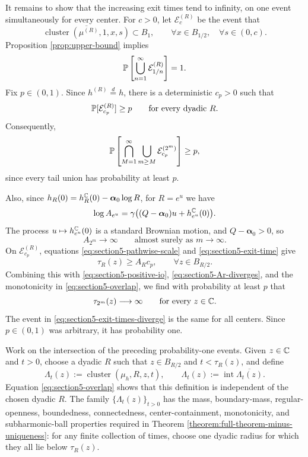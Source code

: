\documentclass[12pt]{amsart}
\numberwithin{equation}{section}
\newcommand{\cluster}[2]{\hyperref[eq:non-co-set]{\mathit{\Lambda}^{#1}_{#2}}}
\newcommand{\regcluster}[2]{\hyperref[eq:regular-cluster]{\Lambda^{#1}_{#2}}}
\begin{document}
	It remains to show that the increasing exit times tend to infinity, on one event simultaneously for every center. For $c>0$, let $\mathcal E_c^{(R)}$ be the event that
	\[
	 \overline{\operatorname{cluster}(\mu^{(R)},1,x,s)}\subset B_1,
	 \qquad \forall x\in B_{1/2},\quad\forall s\in(0,c).
	\]
	Proposition \ref{prop:upper-bound} implies
	\[
	 \P\left[\bigcup_{n=1}^{\infty}\mathcal E_{1/n}^{(R)}\right]=1.
	\]
	Fix $p\in(0,1)$. Since $h^{(R)}\overset{d}{=}h$, there is a deterministic $c_p>0$ such that
	\[
	 \P[\mathcal E_{c_p}^{(R)}]\geq p
	 \qquad\text{for every dyadic }R.
	\]
	Consequently,
	\begin{equation} \label{eq:section5-positive-io}
	 \P\left[\bigcap_{M=1}^{\infty}
	 \bigcup_{m\geq M}\mathcal E_{c_p}^{(2^m)}\right]\geq p,
	\end{equation}
	since every tail union has probability at least $p$.

	Also, since $h_R(0)=h_R^{\C}(0)-\boldsymbol{\alpha}_0\log R$, for $R=e^u$ we have
	\[
	 \log A_{e^u}
	 =\gamma\big((Q-\boldsymbol{\alpha}_0)u+h_{e^u}^{\C}(0)\big).
	\]
	The process $u\mapsto h_{e^u}^{\C}(0)$ is a standard Brownian motion, and $Q-\boldsymbol{\alpha}_0>0$, so
	\begin{equation} \label{eq:section5-Ar-diverges}
	 A_{2^m}\longrightarrow\infty
	 \qquad\text{almost surely as }m\to\infty.
	\end{equation}
	On $\mathcal E_{c_p}^{(R)}$, equations \eqref{eq:section5-pathwise-scale} and \eqref{eq:section5-exit-time} give
	\[
	 \tau_R(z)\geq A_Rc_p,
	 \qquad\forall z\in B_{R/2}.
	\]
	Combining this with \eqref{eq:section5-positive-io}, \eqref{eq:section5-Ar-diverges}, and the monotonicity in \eqref{eq:section5-overlap}, we find with probability at least $p$ that
	\begin{equation} \label{eq:section5-exit-times-diverge}
	 \tau_{2^m}(z)\longrightarrow\infty
	 \qquad\text{for every }z\in\C.
	\end{equation}
	The event in \eqref{eq:section5-exit-times-diverge} is the same for all centers. Since $p\in(0,1)$ was arbitrary, it has probability one.

	Work on the intersection of the preceding probability-one events. Given $z\in\C$ and $t>0$, choose a dyadic $R$ such that $z\in B_{R/2}$ and $t<\tau_R(z)$, and define
	\begin{equation} \label{eq:section5-global-family}
	 {\cluster{}{t}}(z):=\operatorname{cluster}(\mu_h,R,z,t),
	 \qquad
	 {\regcluster{}{t}}(z):=\operatorname{int}\overline{{\cluster{}{t}}(z)}.
	\end{equation}
	Equation \eqref{eq:section5-overlap} shows that this definition is independent of the chosen dyadic $R$. The family $\{{\regcluster{}{t}}(z)\}_{t>0}$ has the mass, boundary-mass, regular-openness, boundedness, connectedness, center-containment, monotonicity, and subharmonic-ball properties required in Theorem \ref{theorem:full-theorem-minus-uniqueness}: for any finite collection of times, choose one dyadic radius for which they all lie below $\tau_R(z)$.
\end{document}

